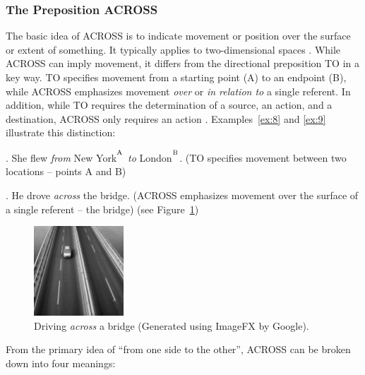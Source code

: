 {{\subsubsection{The Preposition ACROSS}

The basic idea of ACROSS is to indicate movement or position over the surface or extent of something. It typically applies to two-dimensional spaces \parencite{bruckfield2011prepositions}. While ACROSS can imply movement, it differs from the directional preposition TO in a key way. TO specifies movement from a starting point (A) to an endpoint (B), while ACROSS emphasizes movement \emph{over} or \emph{in relation to} a single referent. In addition, while TO requires the determination of a source, an action, and a destination, ACROSS only requires an action \parencite{bruckfield2011prepositions}. Examples~\ref{ex:8} and \ref{ex:9} illustrate this distinction:

\ex. She flew \emph{from} New York$^{\textsuperscript{A}}$ \emph{to} London$^{\textsuperscript{B}}$. (TO specifies movement between two locations -- points A and B)\label{ex:8}

\ex. He drove \emph{across} the bridge. (ACROSS emphasizes movement over the surface of a single referent -- the bridge) (see Figure~\ref{fig: across})\label{ex:9} 

\begin{figure}[ht]
  \centering
  \includegraphics[width=0.3\textwidth]{textual/Figuras/image_fx_driving_a_car_across_a_bridge_black_and_white.jpg}
  \caption{Driving \emph{across} a bridge (Generated using ImageFX by Google).}
  \label{fig: across}
\end{figure}

From the primary idea of ``from one side to the other'', ACROSS can be broken down into four meanings:


}}
